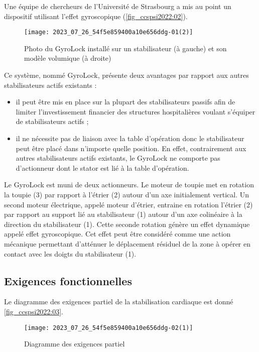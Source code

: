 Une équipe de chercheurs de l'Université de Strasbourg a mis au point un dispositif utilisant l'effet gyroscopique (\autoref{fig_ccspsi2022:02}).

\begin{figure}[!h]
\centering
\texttt{[image: 2023\_07\_26\_54f5e859400a10e656ddg-01(2)]}
\caption{\label{fig_ccspsi2022:02}Photo du GyroLock installé sur un stabilisateur (à gauche) et son modèle volumique (à droite)}
\end{figure}


Ce système, nommé GyroLock, présente deux avantages par rapport aux autres stabilisateurs actifs existants :

\begin{itemize}
  \item il peut être mis en place sur la plupart des stabilisateurs passifs afin de limiter l'investissement financier des structures hospitalières voulant s'équiper de stabilisateurs actifs ;

  \item il ne nécessite pas de liaison avec la table d'opération donc le stabilisateur peut être placé dans n'importe quelle position. En effet, contrairement aux autres stabilisateurs actifs existants, le GyroLock ne comporte pas d'actionneur dont le stator est lié à la table d'opération.

\end{itemize}

Le GyroLock est muni de deux actionneurs. Le moteur de toupie met en rotation la toupie (3) par rapport à l'étrier (2) autour d'un axe initialement vertical. Un second moteur électrique, appelé moteur d'étrier, entraine en rotation l'étrier (2) par rapport au support lié au stabilisateur (1) autour d'un axe colinéaire à la direction du stabilisateur (1). Cette seconde rotation génère un effet dynamique appelé effet gyroscopique. Cet effet peut être considéré comme une action mécanique permettant d'atténuer le déplacement résiduel de la zone à opérer en contact avec les doigts du stabilisateur (1).
\fi

\subsection*{Exigences fonctionnelles}

\ifprof
\else
Le diagramme des exigences partiel de la stabilisation cardiaque est donné \autoref{fig_ccspsi2022:03}.


\begin{figure}[!h]
\centering
\texttt{[image: 2023\_07\_26\_54f5e859400a10e656ddg-02(1)]}
\caption{Diagramme des exigences partiel\label{fig_ccspsi2022:03}}
\end{figure}


